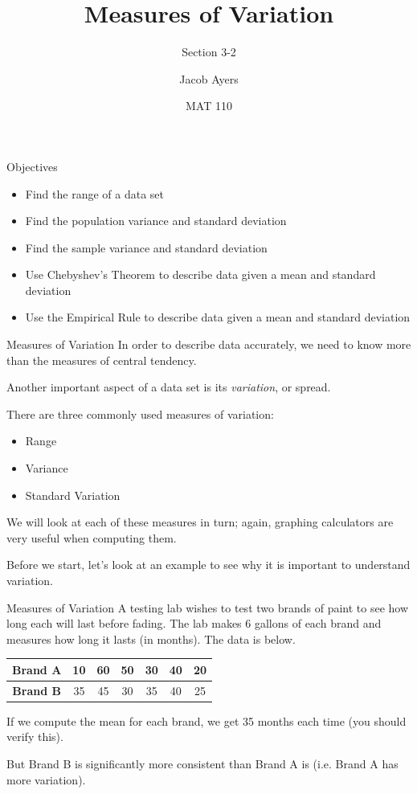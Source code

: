 \documentclass[t, aspectratio=169]{beamer}
\title[3-2]{Measures of Variation}
\subtitle{Section 3-2}
\author{Jacob Ayers}
\institute{Lesson \#6}
\date{MAT 110}
\newcommand{\?}{\stackrel{?}{=}}
\begin{document}
	
	\begin{frame}
		\titlepage
	\end{frame}
	
	\begin{frame}{Objectives}
		\begin{itemize}
			\item Find the range of a data set
			\item Find the population variance and standard deviation
			\item Find the sample variance and standard deviation
			\item Use Chebyshev's Theorem to describe data given a mean and standard deviation
			\item Use the Empirical Rule to describe data given a mean and standard deviation
		\end{itemize}
	\end{frame}

	\begin{frame}{Measures of Variation}
		In order to describe data accurately, we need to know more than the measures of central tendency.
		
		Another important aspect of a data set is its \textit{variation}, or spread. \pause
		
		There are three commonly used measures of variation: \begin{itemize}
			\item Range
			\item Variance
			\item Standard Variation
		\end{itemize} \pause
	
		We will look at each of these measures in turn; again, graphing calculators are very useful when computing them. \pause
		
		Before we start, let's look at an example to see why it is important to understand variation.
	\end{frame}

	\begin{frame}{Measures of Variation}
		A testing lab wishes to test two brands of paint to see how long each will last before fading. The lab makes 6 gallons of each brand and measures how long it lasts (in months). The data is below.
		
		\begin{tabular}{|c|c|c|c|c|c|c|} \hline
			\textbf{Brand A} & 10 & 60 & 50 & 30 & 40 & 20 \\ \hline
			\textbf{Brand B} & 35 & 45 & 30 & 35 & 40 & 25 \\ \hline
		\end{tabular} \pause
	
		If we compute the mean for each brand, we get 35 months each time (you should verify this). \pause
		
		But Brand B is significantly more consistent than Brand A is (i.e. Brand A has more variation).
	\end{frame}
\end{document}
